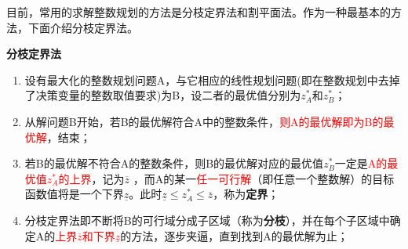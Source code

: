     目前，常用的求解整数规划的方法是分枝定界法和割平面法。作为一种最基本的方法，下面介绍分枝定界法。
    \begin{notebox}{\textbf{分枝定界法}}
        \label{分枝定界法}
        \\
        \begin{enumerate}
            \item 设有最大化的整数规划问题A，与它相应的线性规划问题(即在整数规划中去掉了决策变量的整数取值要求)为B，设二者的最优值分别为$z_A^*$和$z_B^*$；
            \item 从解问题B开始，若B的最优解符合A中的整数条件，\textcolor{red}{则A的最优解即为B的最优解}，结束；
            \item 若B的最优解不符合A的整数条件，则B的最优解对应的最优值$z_B^*$一定是\textcolor{red}{A的最优值$z_A^*$的上界}，记为$\overline{z}$ ，而A的某一\textcolor{red}{任一可行解}（即任意一个整数解）的目标函数值将是一个下界$\underline{z}$。此时$\underline{z}\leq z_A^* \leq \overline{z}$，称为\textbf{定界}；
            \item 分枝定界法即不断将B的可行域分成子区域（称为\textbf{分枝}），并在每个子区域中确定A的\textcolor{red}{上界$\overline{z}$和下界$\underline{z}$}的方法，逐步夹逼，直到找到A的最优解为止；
        \end{enumerate}
    \end{notebox}

